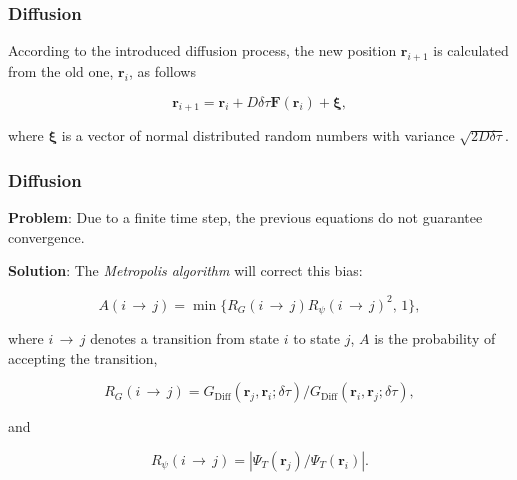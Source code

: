 \begin{frame}
 \frametitle{Diffusion}
 
%  
%  

According to the introduced diffusion process, the new position $\mathbf{r}_{i+1}$ is calculated from the old one, $\mathbf{r}_i$, as follows
 
 \begin{equation*}
  \mathbf{r}_{i+1} = \mathbf{r}_i + D\delta\tau\mathbf{F}(\mathbf{r}_i) + \mathbf{\xi}, 
 \end{equation*}

where $\mathbf{\xi}$ is a vector of normal distributed random numbers with variance $\sqrt{2D\delta\tau}$.
 
\end{frame}

\begin{frame}
\frametitle{Diffusion}

\textbf{Problem}: Due to a finite time step, the previous equations do not guarantee convergence.  
\shift

\textbf{Solution}: The \textit{Metropolis algorithm} will correct this bias:  

\begin{equation}
  A(i\,\rightarrow\,j) = \min\{R_G(i\,\rightarrow\,j)R_\psi(i\,\rightarrow\,j)^2, \,1\},
\end{equation}

where $i\,\rightarrow\,j$ denotes a transition from state $i$ to state $j$, $A$ is the probability of accepting the transition, 

\begin{equation*}
 R_G(i\,\rightarrow\,j) = G_\mathrm{Diff}(\mathbf{r}_{j}, \mathbf{r}_{i}; \delta\tau)/G_\mathrm{Diff}(\mathbf{r}_{i}, \mathbf{r}_{j}; \delta\tau),
\end{equation*}

and

\begin{equation*}
 R_\psi(i\,\rightarrow\,j) = |\Psi_T(\mathbf{r}_j)/\Psi_T(\mathbf{r}_i)|.
\end{equation*}

\end{frame}



